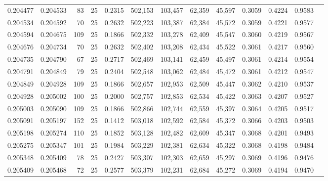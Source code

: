 \begin{tabular}{rrrrrrrrrrrrr}
0.204477 & 0.204533 &    83 &  25 &                                     0.2315 & 502,153 & 103,457 &  62,359 &  45,597 & 0.3059 & 0.4224 & 0.9583 \\
0.204534 & 0.204592 &    70 &  25 &                                     0.2632 & 502,223 & 103,387 &  62,384 &  45,572 & 0.3059 & 0.4221 & 0.9577 \\
0.204594 & 0.204675 &   109 &  25 &                                     0.1866 & 502,332 & 103,278 &  62,409 &  45,547 & 0.3060 & 0.4219 & 0.9567 \\
0.204676 & 0.204734 &    70 &  25 &                                     0.2632 & 502,402 & 103,208 &  62,434 &  45,522 & 0.3061 & 0.4217 & 0.9560 \\
0.204735 & 0.204790 &    67 &  25 &                                     0.2717 & 502,469 & 103,141 &  62,459 &  45,497 & 0.3061 & 0.4214 & 0.9554 \\
0.204791 & 0.204849 &    79 &  25 &                                     0.2404 & 502,548 & 103,062 &  62,484 &  45,472 & 0.3061 & 0.4212 & 0.9547 \\
0.204849 & 0.204928 &   109 &  25 &                                     0.1866 & 502,657 & 102,953 &  62,509 &  45,447 & 0.3062 & 0.4210 & 0.9537 \\
0.204928 & 0.205002 &   100 &  25 &                                     0.2000 & 502,757 & 102,853 &  62,534 &  45,422 & 0.3063 & 0.4207 & 0.9527 \\
0.205003 & 0.205090 &   109 &  25 &                                     0.1866 & 502,866 & 102,744 &  62,559 &  45,397 & 0.3064 & 0.4205 & 0.9517 \\
0.205091 & 0.205197 &   152 &  25 &                                     0.1412 & 503,018 & 102,592 &  62,584 &  45,372 & 0.3066 & 0.4203 & 0.9503 \\
0.205198 & 0.205274 &   110 &  25 &                                     0.1852 & 503,128 & 102,482 &  62,609 &  45,347 & 0.3068 & 0.4201 & 0.9493 \\
0.205275 & 0.205347 &   101 &  25 &                                     0.1984 & 503,229 & 102,381 &  62,634 &  45,322 & 0.3068 & 0.4198 & 0.9484 \\
0.205348 & 0.205409 &    78 &  25 &                                     0.2427 & 503,307 & 102,303 &  62,659 &  45,297 & 0.3069 & 0.4196 & 0.9476 \\
0.205409 & 0.205468 &    72 &  25 &                                     0.2577 & 503,379 & 102,231 &  62,684 &  45,272 & 0.3069 & 0.4194 & 0.9470 \\

\end{tabular}
